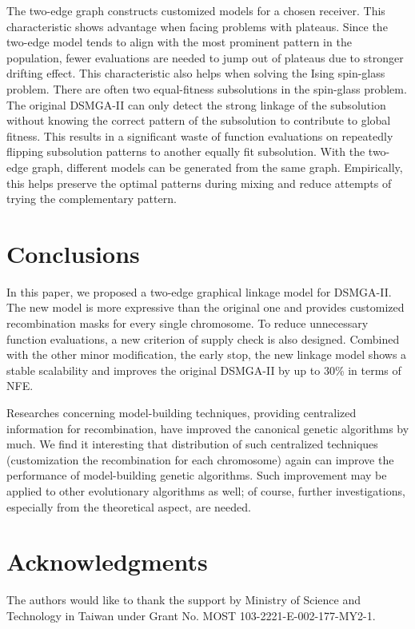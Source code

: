\documentclass{sig-alternate-05-2015}
\begin{document}
The two-edge graph constructs customized models for a chosen receiver. 
This characteristic shows advantage when facing problems with plateaus.
Since the two-edge model tends to align with the most prominent pattern in the population, fewer evaluations are needed to jump out of plateaus due to stronger drifting effect. This characteristic also helps when solving the Ising spin-glass problem. 
There are often two equal-fitness subsolutions in the spin-glass problem.
The original DSMGA-II can only detect the strong linkage of the subsolution without knowing the correct pattern of the subsolution to contribute to global fitness.
This results in a significant waste of function evaluations on repeatedly flipping subsolution patterns to another equally fit subsolution.
With the two-edge graph, different models can be generated from the same graph. 
Empirically, this helps preserve the optimal patterns during mixing and reduce attempts of trying the complementary pattern.



\section{Conclusions}
 
In this paper, we proposed a two-edge graphical linkage model for DSMGA-II. 
The new model is more expressive than the original one and provides customized recombination masks for every single chromosome. 
To reduce unnecessary function evaluations, a new criterion of supply check  is also designed. Combined with the other minor modification, the early stop, the new linkage model shows a stable scalability and improves the original DSMGA-II by up to 30\% in terms of NFE.



Researches concerning model-building techniques, providing centralized information for recombination, have improved the canonical genetic algorithms by much. 
We find it interesting that distribution of such centralized techniques (customization the recombination for each chromosome) again can improve the performance of model-building genetic algorithms. 
Such improvement may be applied to other evolutionary algorithms as well; of course,  further investigations, especially from the theoretical aspect, are needed.  



\section{Acknowledgments}
The authors would like to thank the support by Ministry of Science and Technology in Taiwan under Grant No. MOST 103-2221-E-002-177-MY2-1.
\end{document}
